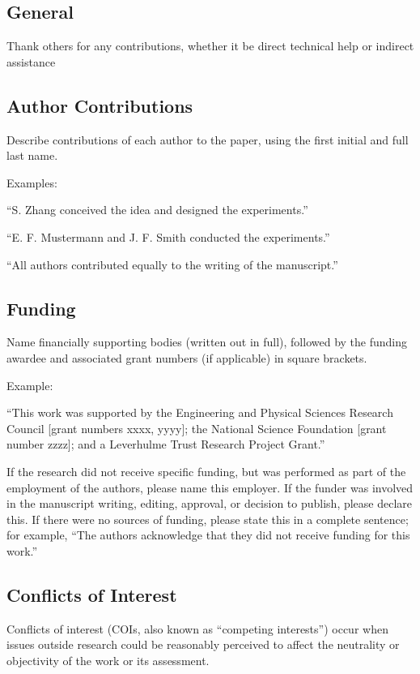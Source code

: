 \documentclass{article}
\begin{document}
\subsection*{General} 
Thank others for any contributions, whether it be direct technical help or indirect assistance 

\subsection*{Author Contributions} 
Describe contributions of each author to the paper, using the first initial and full last name. 

\medskip Examples:

``S. Zhang conceived the idea and designed the experiments.''

``E. F. Mustermann and J. F. Smith conducted the experiments.''

``All authors contributed equally to the writing of the manuscript.''

\subsection*{Funding}
Name financially supporting bodies (written out in full), followed by the funding awardee and associated grant numbers (if applicable) in square brackets. 

\medskip Example: 

``This work was supported by the Engineering and Physical Sciences Research Council [grant numbers xxxx, yyyy]; the National Science Foundation [grant number zzzz]; and a Leverhulme Trust Research Project Grant.'' 

\medskip
If the research did not receive specific funding, but was performed as part of the employment of the authors, please name this employer. If the funder was involved in the manuscript writing, editing, approval, or decision to publish, please declare this. If there were no sources of funding, please state this in a complete sentence; for example, “The authors acknowledge that they did not receive funding for this work.”

\subsection*{Conflicts of Interest}
Conflicts of interest (COIs, also known as ``competing interests'') occur when issues outside research could be reasonably perceived to affect the neutrality or objectivity of the work or its assessment. 
\end{document}
